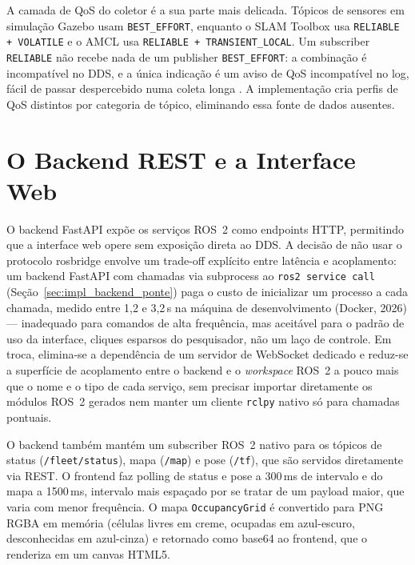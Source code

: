 A camada de QoS do coletor é a sua parte mais delicada. Tópicos de sensores
em simulação Gazebo usam \texttt{BEST\_\allowbreak EFFORT}, enquanto o SLAM Toolbox
\cite{macenski2021slam} usa \texttt{RELIABLE + VOLATILE} e o AMCL usa
\texttt{RELIABLE + TRANSIENT\_\allowbreak LOCAL}. Um subscriber \texttt{RELIABLE} não recebe nada de um publisher
\texttt{BEST\_\allowbreak EFFORT}: a combinação é incompatível no DDS, e a única
indicação é um aviso de QoS incompatível no log, fácil de passar despercebido
numa coleta longa \cite{macenski2022ros2}. A implementação cria perfis de QoS distintos por
categoria de tópico, eliminando essa fonte de dados ausentes.

\section{O Backend REST e a Interface Web}
\label{sec:backend_web}

O backend FastAPI expõe os serviços ROS~2 como endpoints HTTP, permitindo que a
interface web opere sem exposição direta ao DDS. A decisão de não usar o
protocolo rosbridge \cite{toris2015} envolve um trade-off explícito entre
latência e acoplamento: um backend FastAPI com chamadas via subprocess ao
\texttt{ros2 service call} (Seção~\ref{sec:impl_backend_ponte}) paga o custo
de inicializar um processo a cada chamada, medido entre 1,2 e 3,2\,s na
máquina de desenvolvimento (Docker, 2026) --- inadequado para comandos de alta frequência,
mas aceitável para o padrão de uso da interface, cliques esparsos do
pesquisador, não um laço de controle. Em troca, elimina-se a dependência de
um servidor de WebSocket dedicado e reduz-se a superfície de acoplamento
entre o backend e o \textit{workspace} ROS~2 a pouco mais que o nome e o
tipo de cada serviço, sem precisar importar diretamente os módulos ROS~2
gerados nem manter um cliente \texttt{rclpy} nativo só para chamadas
pontuais.

O backend também mantém um subscriber ROS~2 nativo para os tópicos de status
(\texttt{/\allowbreak fleet/\allowbreak status}), mapa (\texttt{/\allowbreak map}) e pose (\texttt{/\allowbreak tf}), que são
servidos diretamente via REST. O frontend faz polling de status e pose a
300\,ms de intervalo e do mapa a 1500\,ms, intervalo mais espaçado por se
tratar de um payload maior, que varia com menor frequência. O mapa
\texttt{OccupancyGrid} \cite{elfes1989} é convertido para PNG RGBA em memória
(células livres em creme, ocupadas em azul-escuro, desconhecidas em azul-cinza)
e retornado como base64 ao frontend, que o renderiza em um canvas HTML5.

